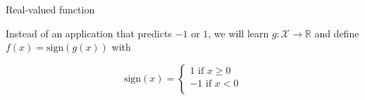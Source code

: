 \documentclass[usenames,dvipsnames,french]{beamer}
\begin{document}
% 
% 
% 
% 
% 
\begin{frame}{Real-valued function}

    Instead of an application that predicts $-1$ or $1$, we will learn $g: \mathcal{X} \rightarrow \mathbb{R} $ and define $ f(x) = \text{sign}(g(x))$ with
    
         $$
	    \text{sign}(x) = \left\{
                \begin{array}{ll}
                    1 \text{ if } x\geq 0   \\
		    -1 \text{ if } x<0   \\
                \end{array}
                \right.
                $$
\end{frame}

%
%
\end{document}
